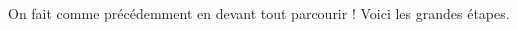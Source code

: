On fait comme précédemment en devant tout parcourir !
Voici les grandes étapes.

\begin{multicols}{2}


\phantom{\emptybox\emptybox}%
	\deah

\emptybox\emptybox%
\emptybox\emptybox

\emptybox\emptybox%
	\emptybox\emptybox\emptybox\emptybox\emptybox\emptybox\emptybox%
\emptybox\emptybox

\phantom{\emptybox\emptybox}%
	\head


\medskip %

\phantom{\emptybox\emptybox\emptybox\emptybox\emptybox\emptybox\emptybox\emptybox\emptybox}%
	\deah

\emptybox\emptybox%
\emptybox\emptybox

\emptybox\emptybox%
\emptybox\emptybox

\phantom{\emptybox\emptybox\emptybox\emptybox\emptybox\emptybox\emptybox\emptybox\emptybox}%
	\head


\vfill\null
\columnbreak %

\phantom{\emptybox}%
	\deah

\emptybox\emptybox%
\emptybox\emptybox

\emptybox\emptybox%
\emptybox\emptybox

\phantom{\emptybox\emptybox\emptybox\emptybox\emptybox\emptybox\emptybox\emptybox\emptybox}%
	\head


\medskip %

\phantom{\emptybox\emptybox\emptybox\emptybox\emptybox\emptybox\emptybox\emptybox\emptybox}%
	\deah

\emptybox\emptybox%
\emptybox\emptybox

\emptybox\emptybox%
\emptybox\emptybox

\phantom{\emptybox}%
	\head

\vfill\null
\end{multicols}
